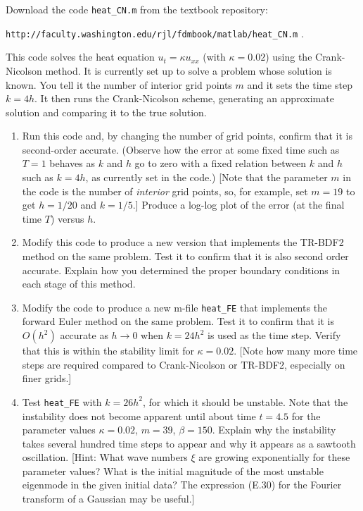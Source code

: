 \documentclass[10pt]{article}
\begin{document}
\begin{problem}[Problem 3]
Download the code \verb+heat_CN.m+ from the textbook repository:

\verb+http://faculty.washington.edu/rjl/fdmbook/matlab/heat_CN.m+ .

This code solves the heat equation \(u_t = \kappa u_{xx}\) (with \(\kappa = 0.02\)) using the Crank-Nicolson method. It is currently set up to solve a problem whose solution is known.  You tell it the number of interior grid points \(m\) and it sets the time step \(k = 4h\). It then runs the Crank-Nicolson scheme, generating an approximate solution and comparing it to the true solution.
\begin{enumerate}[label=(\alph*)]
\item Run this code and, by changing the number of grid points, confirm that it is second-order accurate. (Observe how the error at some fixed time such as \(T=1\) behaves as \(k\) and \(h\) go to zero with a fixed relation between \(k\) and \(h\) such as \(k = 4h\), as currently set in the code.) [Note that the parameter \(m\) in the code is the number of {\em interior} grid points, so, for example, set \(m=19\) to get \(h=1/20\) and \(k=1/5\).] Produce a log-log plot of the error (at the final time \(T\)) versus \(h\).
\item Modify this code to produce a new version that implements the TR-BDF2 method on the same problem. Test it to confirm that it is also second order accurate.  Explain how you determined the proper boundary conditions in each stage of this method.
\item Modify the code to produce a new m-file \verb+heat_FE+ that implements the forward Euler method on the same problem.  Test it to confirm that it is \(O( h^2 )\) accurate as \(h \rightarrow 0\) when \(k = 24 h^2\) is used as the time step.  Verify that this is within the stability limit for \(\kappa = 0.02\).  [Note how many more time steps are required compared to Crank-Nicolson or TR-BDF2, especially on finer grids.]
\item Test \verb+heat_FE+ with \(k = 26 h^2\), for which it should be unstable.  Note that the instability does not become apparent until about time \(t=4.5\) for the parameter values \(\kappa = 0.02\), \(m = 39\), \(\beta = 150\).  Explain why the instability takes several hundred time steps to appear and why it appears as a sawtooth oscillation. [Hint:  What wave numbers \(\xi\) are growing exponentially for these parameter values?  What is the initial magnitude of the most unstable eigenmode in the given initial data? The expression (E.30) for the Fourier transform of a Gaussian may be useful.]
\end{enumerate}
\end{problem}
\end{document}
